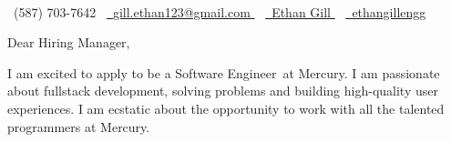 
\newcommand{\userName}{Ethan Gill}
\newcommand{\userFullName}{Ethan Gill}
\newcommand{\userPhone}{(587) 703-7642}
\newcommand{\userEmail}{gill.ethan123@gmail.com}
\newcommand{\userGithub}{ethangillengg}
\newcommand{\userLinkedIn}{https://www.linkedin.com/in/ethan-gill-008a00258/}
\newcommand{\currentUniversity}{the University of Calgary's Schulich School of Engineering}
\newcommand{\companyName}{Mercury}
\newcommand{\jobTitle}{Software Engineer}
\newcommand{\introTopics}{fullstack development, solving problems and building high-quality user experiences}
\newcommand{\whyMePersonalized}{Since my graduation, I have been able to utilize all of the concepts I learned through my education while also expanding my knowledge base.

	\par
	I work with ASP.NET and SQL Server on a daily basis, while also working with jQuery. This matches perfectly with the architecture at \companyName~and will allow me to transition smoothly into the role.
}



\begin{center}
	{\Huge \scshape \color{base07}{Ethan Gill}} \\ \vspace{4pt}
	\small \raisebox{-0.1\height}\faPhone\ \userPhone ~
	\href{mailto:\userEmail}{
		\raisebox{-0.2\height}\faEnvelope\  \underline{\userEmail}
	} ~
	\href{\userLinkedIn}{
		\raisebox{-0.2\height}\faLinkedin\ \underline{\userName}
	} ~
	\href{https://github.com/\userGithub}{
		\raisebox{-0.2\height}\faGithub\ \underline{\userGithub}
	} 
\end{center}

\vspace{8pt}

\noindent{}\large{Dear Hiring Manager,}

\par{}

I am excited to apply to be a \jobTitle~at \companyName. I am passionate about \introTopics. I am ecstatic about the opportunity to work with all the talented programmers at \companyName.

